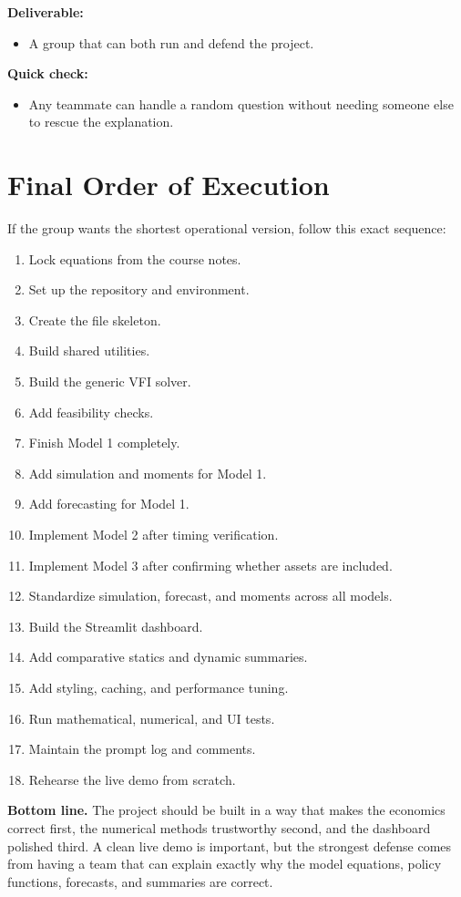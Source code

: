 \documentclass[11pt]{article}
\begin{document}
\textbf{Deliverable:}
\begin{itemize}
    \item A group that can both run and defend the project.
\end{itemize}

\textbf{Quick check:}
\begin{itemize}
    \item Any teammate can handle a random question without needing someone else to rescue the explanation.
\end{itemize}

\section{Final Order of Execution}

If the group wants the shortest operational version, follow this exact sequence:

\begin{enumerate}[label=\textbf{\arabic*.}]
    \item Lock equations from the course notes.
    \item Set up the repository and environment.
    \item Create the file skeleton.
    \item Build shared utilities.
    \item Build the generic VFI solver.
    \item Add feasibility checks.
    \item Finish Model 1 completely.
    \item Add simulation and moments for Model 1.
    \item Add forecasting for Model 1.
    \item Implement Model 2 after timing verification.
    \item Implement Model 3 after confirming whether assets are included.
    \item Standardize simulation, forecast, and moments across all models.
    \item Build the Streamlit dashboard.
    \item Add comparative statics and dynamic summaries.
    \item Add styling, caching, and performance tuning.
    \item Run mathematical, numerical, and UI tests.
    \item Maintain the prompt log and comments.
    \item Rehearse the live demo from scratch.
\end{enumerate}

\begin{goalbox}
\textbf{Bottom line.} The project should be built in a way that makes the economics correct first, the numerical methods trustworthy second, and the dashboard polished third. A clean live demo is important, but the strongest defense comes from having a team that can explain exactly why the model equations, policy functions, forecasts, and summaries are correct.
\end{goalbox}
\end{document}
